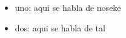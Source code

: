 \documentclass[12pt,a4paper]{article}
\begin{document}

\begin{itemize} 
\item uno: aqui se habla de noseke
\item dos: aqui se habla de tal
\end{itemize}
%

\begin{comment}

\begin{figure}[h!]
\centering
  \texttt{[image: 2\_1.jpeg]}
  \caption{Pantalla de inicio}
  \label{fig:img1}

  \centering
  \begin{subfigure}[b]{0.45\linewidth}
    \texttt{[image: 2\_2.jpeg]}

  \end{subfigure}
  \begin{subfigure}[b]{0.45\linewidth}
    \texttt{[image: 2\_3.jpeg]}

  \end{subfigure}
  \label{fig:units}


  \begin{subfigure}[b]{0.45\linewidth}
    \texttt{[image: 2\_4.jpeg]}

  \end{subfigure}
  \begin{subfigure}[b]{0.45\linewidth}
    \texttt{[image: 2\_5.jpeg]}


  \end{subfigure}
  \label{fig:units}

\end{figure}

\end{comment}



\end{document}
